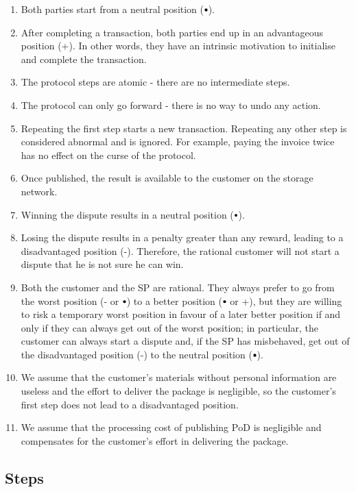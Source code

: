 \documentclass[pdftex,twocolumn,epjc3]{svjour3}
\newcommand{\plus}{+}
\newcommand{\minus}{-}
\newcommand\neutral[1][.75]{\mathbin{\ThisStyle{\vcenter{\hbox{%
  \scalebox{#1}{$\SavedStyle\bullet$}}}}}%
}
\begin{document}
{\begin{enumerate}
\item Both parties start from a neutral position ($\neutral${}).
\item After completing a transaction, both parties end up in an advantageous position (\plus{}). In other words, they have an intrinsic motivation to initialise and complete the transaction.
\item The protocol steps are atomic - there are no intermediate steps.
\item The protocol can only go forward - there is no way to undo any action.
\item Repeating the first step starts a new transaction. Repeating any other step is considered abnormal and is ignored. For example, paying the invoice twice has no effect on the curse of the protocol.
\item Once published, the result is available to the customer on the storage network. 
\item Winning the dispute results in a neutral position ($\neutral${}).
\item Losing the dispute results in a penalty greater than any reward, leading to a disadvantaged position (\minus{}). Therefore, the rational customer will not start a dispute that he is not sure he can win.
\item Both the customer and the SP are rational. They always prefer to go from the worst position (\minus{} or $\neutral${}) to a better position ($\neutral${} or \plus), but they are willing to risk a temporary worst position in favour of a later better position if and only if they can always get out of the worst position; in particular, the customer can always start a dispute and, if the SP has misbehaved, get out of the disadvantaged position (\minus) to the neutral position ($\neutral${}).
\item We assume that the customer's materials without personal information are useless and the effort to deliver the package is negligible, so the customer's first step does not lead to a disadvantaged position.
\item We assume that the processing cost of publishing $\mathrm{PoD}$ is negligible and compensates for the customer's effort in delivering the package.
\end{enumerate}

\subsection{Steps}\label{sec:steps}

}
\end{document}
